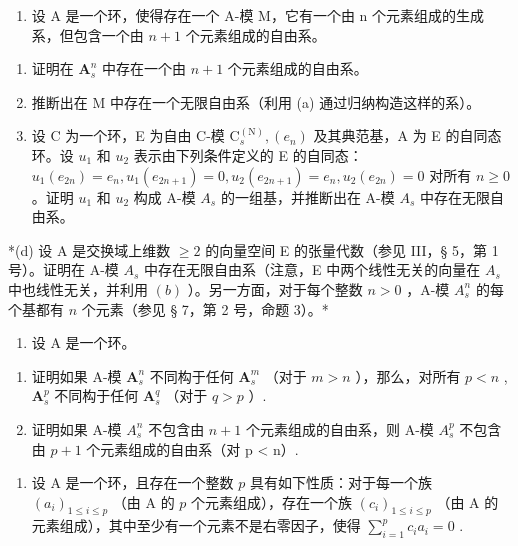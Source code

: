 \begin{enumerate}
\def\labelenumi{\arabic{enumi}.}
\setcounter{enumi}{15}
\tightlist
\item
  设 A 是一个环，使得存在一个 A-模 M，它有一个由 n 个元素组成的生成系，但包含一个由 \(n + 1\) 个元素组成的自由系。
\end{enumerate}

\begin{enumerate}
\def\labelenumi{(\alph{enumi})}
\item
  证明在 \(\mathbf{A}_s^n\) 中存在一个由 \(n + 1\) 个元素组成的自由系。
\item
  推断出在 M 中存在一个无限自由系（利用 (a) 通过归纳构造这样的系）。
\item
  设 C 为一个环，E 为自由 C-模 \(\mathrm{C}_{s}^{(\mathrm{N})}, (e_{n})\) 及其典范基，A 为 E 的自同态环。设 \(u_{1}\) 和 \(u_{2}\) 表示由下列条件定义的 E 的自同态： \(u_{1}(e_{2n}) = e_{n}, u_{1}(e_{2n+1}) = 0, u_{2}(e_{2n+1}) = e_{n}, u_{2}(e_{2n}) = 0\) 对所有 \(n \geqslant 0\) 。证明 \(u_{1}\) 和 \(u_{2}\) 构成 A-模 \(A_{s}\) 的一组基，并推断出在 A-模 \(A_{s}\) 中存在无限自由系。
\end{enumerate}

*(d) 设 A 是交换域上维数 \(\geqslant 2\) 的向量空间 E 的张量代数（参见 III，§ 5，第 1 号）。证明在 A-模 \(A_s\) 中存在无限自由系（注意，E 中两个线性无关的向量在 \(A_s\) 中也线性无关，并利用 \((b)\) ）。另一方面，对于每个整数 \(n > 0\) ，A-模 \(A_s^n\) 的每个基都有 \(n\) 个元素（参见 § 7，第 2 号，命题 3）。*

\begin{enumerate}
\def\labelenumi{\arabic{enumi}.}
\setcounter{enumi}{16}
\tightlist
\item
  设 A 是一个环。
\end{enumerate}

\begin{enumerate}
\def\labelenumi{(\alph{enumi})}
\item
  证明如果 A-模 \(\mathbf{A}_s^n\) 不同构于任何 \(\mathbf{A}_s^m\) （对于 \(m > n\) ），那么，对所有 \(p < n\) , \(\mathbf{A}_s^p\) 不同构于任何 \(\mathbf{A}_s^q\) （对于 \(q > p\) ）.
\item
  证明如果 A-模 \(A_{s}^{n}\) 不包含由 \(n + 1\) 个元素组成的自由系，则 A-模 \(A_{s}^{p}\) 不包含由 \(p + 1\) 个元素组成的自由系（对 p \textless{} n）.
\end{enumerate}

\begin{enumerate}
\def\labelenumi{\arabic{enumi}.}
\setcounter{enumi}{17}
\tightlist
\item
  设 A 是一个环，且存在一个整数 \(p\) 具有如下性质：对于每一个族 \((a_i)_{1 \leqslant i \leqslant p}\) （由 A 的 \(p\) 个元素组成），存在一个族 \((c_i)_{1 \leqslant i \leqslant p}\) （由 A 的元素组成），其中至少有一个元素不是右零因子，使得 \(\sum_{i=1}^{p} c_i a_i = 0\) .
\end{enumerate}

